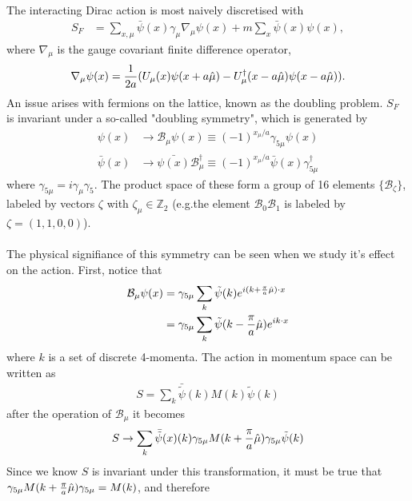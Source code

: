 \documentclass[a4paper,10pt]{article}
\numberwithin{equation}{section}
\begin{document}
The interacting Dirac action is most naively discretised with
\begin{align}
 S_F &= \sum_{x,\mu} \bar{\psi}(x) \gamma_{\mu} \nabla_{\mu} \psi(x) + m\sum_x \bar{\psi}(x) \psi(x),
 \label{eq:naivefermions}
\end{align}
where $\nabla_{\mu}$ is the gauge covariant finite difference operator,
\begin{align}	
	\nabla_{\mu} \psi(x) = {1\over 2a} ( U_{\mu} (x) \psi(x+a\hat{\mu}) - U^{\dagger}_{\mu}(x-a\hat{\mu})\psi(x-a\hat{\mu}) ).
\label{eq:lat_derivative}
\end{align}
An issue arises with fermions on the lattice, known as the doubling problem. $S_F$ is invariant under a so-called "doubling symmetry", which is generated by
\begin{align}
	\label{eq:doublingsymmetry}
	\psi(x) & \to \mathcal{B}_{\mu} \psi(x) \equiv  (-1)^{x_{\mu}/a} \gamma_{5\mu} \psi(x) \\
	\bar{\psi}(x) & \to \bar{\psi(x)}\mathcal{B}^{\dagger}_{\mu} \equiv (-1)^{x_{\mu}/a} \bar{\psi}(x) \gamma^{\dagger}_{5\mu}
\end{align}
where $\gamma_{5\mu} = i\gamma_{\mu}\gamma_5$. The product space of these form a group of 16 elements $\{\mathcal{B}_{\zeta}\}$, labeled  by vectors $\zeta$ with $\zeta_{\mu}\in \mathbb{Z}_2$ (e.g.the element $\mathcal{B}_{0}\mathcal{B}_{1}$ is labeled by $\zeta=(1,1,0,0)$).
\\ \\
The physical signifiance of this symmetry can be seen when we study it's effect on the action. First, notice that
\begin{align}
	\mathcal{B}_{\mu} \psi(x) & = \gamma_{5\mu} \sum_k \tilde{\psi}(k) e^{i(k+{\pi\over a}\hat{\mu})\cdot x} \\
	& = \gamma_{5\mu} \sum_k \tilde{\psi}(k-{\pi\over a}\hat{\mu})e^{ik\cdot x}
\end{align}
where $k$ is a set of discrete 4-momenta. The action in momentum space can be written as
\begin{align}
	S = \sum_k \bar{\tilde{\psi}}(k) M(k) \tilde{\psi}(k)
\end{align}
after the operation of $\mathcal{B}_{\mu}$ it becomes
\begin{align}
	S \to \sum_k \bar{\tilde{\psi}}(x)(k) \gamma_{5\mu} M(k+{\pi\over a}\hat{\mu})\gamma_{5\mu} \tilde{\psi}(k)
\end{align}
Since we know $S$ is invariant under this transformation, it must be true that $\gamma_{5\mu} M(k+{\pi\over a}\hat{\mu})\gamma_{5\mu} = M(k)$, and therefore
\end{document}
